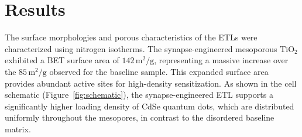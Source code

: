 \section{Results}
The surface morphologies and porous characteristics of the ETLs were characterized using nitrogen isotherms. The synapse-engineered mesoporous $\text{TiO}_2$ exhibited a BET surface area of $142\,\text{m}^2/\text{g}$, representing a massive increase over the $85\,\text{m}^2/\text{g}$ observed for the baseline sample. This expanded surface area provides abundant active sites for high-density sensitization. As shown in the cell schematic (Figure~\ref{fig:schematic}), the synapse-engineered ETL supports a significantly higher loading density of CdSe quantum dots, which are distributed uniformly throughout the mesopores, in contrast to the disordered baseline matrix.

